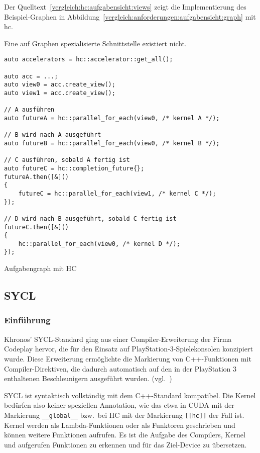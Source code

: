 Der Quelltext~\ref{vergleich:hc:aufgabensicht:views} zeigt die
Implementierung des Beispiel-Graphen
in Abbildung~\ref{vergleich:anforderungen:aufgabensicht:graph} mit
\gls{hc}.

Eine auf Graphen spezialisierte Schnittstelle existiert nicht.

\begin{code}
    \begin{verbatim}
auto accelerators = hc::accelerator::get_all();

auto acc = ...;
auto view0 = acc.create_view();
auto view1 = acc.create_view();
        
// A ausführen
auto futureA = hc::parallel_for_each(view0, /* kernel A */);

// B wird nach A ausgeführt
auto futureB = hc::parallel_for_each(view0, /* kernel B */);

// C ausführen, sobald A fertig ist
auto futureC = hc::completion_future{};
futureA.then([&]()
{
    futureC = hc::parallel_for_each(view1, /* kernel C */);
});

// D wird nach B ausgeführt, sobald C fertig ist
futureC.then([&]()
{
    hc::parallel_for_each(view0, /* kernel D */);
});
    \end{verbatim}
    \caption{Aufgabengraph mit HC}
    \label{vergleich:hc:aufgabensicht:views}
\end{code}


\subsection{SYCL}
\label{vergleich:sycl}

\subsubsection{Einführung}

Khronos' SYCL-Standard ging aus einer Compiler-Erweiterung der Firma Codeplay
hervor, die für den Einsatz auf PlayStation-3-Spielekonsolen konzipiert wurde.
Diese Erweiterung ermöglichte die Markierung von C++-Funktionen mit
Compiler-Direktiven, die dadurch automatisch auf den in der PlayStation 3
enthaltenen Beschleunigern ausgeführt wurden. (vgl.~\cite{lomueller2016})

SYCL ist syntaktisch vollständig mit dem C++-Standard kompatibel. Die Kernel
bedürfen also keiner speziellen Annotation, wie das etwa in CUDA mit der
Markierung \texttt{\_\_global\_\_} bzw.\ bei HC mit der Markierung
\texttt{[[hc]]} der Fall ist. Kernel werden als Lambda-Funktionen oder als
Funktoren geschrieben und können weitere Funktionen aufrufen. Es ist die Aufgabe
des Compilers, Kernel und aufgerufen Funktionen zu erkennen und für das
Ziel-Device zu übersetzen.

